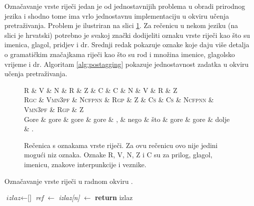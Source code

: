 Označavanje vrste riječi jedan je od jednostavnijih problema u obradi prirodnog
jezika i shodno tome ima vrlo jednostavnu implementaciju u okviru učenja
pretraživanja. Problem je ilustriran na slici \ref{fig:postagging}. Za rečenicu
u nekom jeziku (na slici je hrvatski) potrebno je svakoj znački dodijeliti
oznaku vrste riječi kao što su imenica, glagol, pridjev i dr. Srednji redak
pokazuje oznake koje daju više detalja o gramatičkim značajkama riječi kao što
su rod i množina imenice, glagolsko vrijeme i dr. Algoritam \ref{alg:postagging}
pokazuje jednostavnost zadatka u okviru učenja pretraživanja.

\begin{figure}
\centering
\begin{dependency}
\begin{deptext}
  \textsc{R}   \& \textsc{V}      \& \textsc{N}      \& \textsc{R}   \& \textsc{Z} \& \textsc{C}  \& \textsc{C}  \& \textsc{N}      \& \textsc{V}      \& \textsc{R}   \& \textsc{Z} \\
  \textsc{Rgc} \& \textsc{Vmn3pf} \& \textsc{Ncfpnn} \& \textsc{Rgp} \& \textsc{Z} \& \textsc{Cs} \& \textsc{Cs} \& \textsc{Ncfpnn} \& \textsc{Vmn3pf} \& \textsc{Rgp} \& \textsc{Z} \\
  Gore         \& gore            \& gore            \& gore         \& ,          \& nego        \& što         \& gore            \& gore            \& dolje        \& .          \\
\end{deptext}
\end{dependency}
\caption[Rečenica s oznakama vrste riječi.]{Rečenica s oznakama vrste riječi. Za
ovu rečenicu ovo nije jedini mogući niz oznaka. Oznake R, V, N, Z i C su za
prilog, glagol, imenicu, znakove interpunkcije i veznike.}
\label{fig:postagging}
\end{figure}

\begin{algorithm}
\caption{Označavanje vrste riječi u radnom okviru \lts{}.}\label{alg:postagging}
\begin{algorithmic}[1]
\State $\textit{izlaz} \gets \text{[]}$
  \State \textit{ref} $\gets$ 
  \State \textit{izlaz[n]} $\gets$ 
\EndFor
\State {}
\State \textbf{return} izlaz
\EndFunction
\end{algorithmic}
\end{algorithm}

